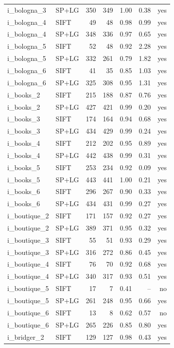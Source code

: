\begin{longtable}{llrrrrr}
i\_bologna\_3 & SP+LG & 350 & 349 & 1.00 & 0.38 & yes \\
i\_bologna\_4 & SIFT & 49 & 48 & 0.98 & 0.99 & yes \\
i\_bologna\_4 & SP+LG & 348 & 336 & 0.97 & 0.65 & yes \\
i\_bologna\_5 & SIFT & 52 & 48 & 0.92 & 2.28 & yes \\
i\_bologna\_5 & SP+LG & 332 & 261 & 0.79 & 1.82 & yes \\
i\_bologna\_6 & SIFT & 41 & 35 & 0.85 & 1.03 & yes \\
i\_bologna\_6 & SP+LG & 325 & 308 & 0.95 & 1.31 & yes \\
i\_books\_2 & SIFT & 215 & 188 & 0.87 & 0.76 & yes \\
i\_books\_2 & SP+LG & 427 & 421 & 0.99 & 0.20 & yes \\
i\_books\_3 & SIFT & 174 & 164 & 0.94 & 0.68 & yes \\
i\_books\_3 & SP+LG & 434 & 429 & 0.99 & 0.24 & yes \\
i\_books\_4 & SIFT & 212 & 202 & 0.95 & 0.89 & yes \\
i\_books\_4 & SP+LG & 442 & 438 & 0.99 & 0.31 & yes \\
i\_books\_5 & SIFT & 253 & 234 & 0.92 & 0.09 & yes \\
i\_books\_5 & SP+LG & 443 & 441 & 1.00 & 0.21 & yes \\
i\_books\_6 & SIFT & 296 & 267 & 0.90 & 0.33 & yes \\
i\_books\_6 & SP+LG & 434 & 431 & 0.99 & 0.27 & yes \\
i\_boutique\_2 & SIFT & 171 & 157 & 0.92 & 0.27 & yes \\
i\_boutique\_2 & SP+LG & 389 & 371 & 0.95 & 0.32 & yes \\
i\_boutique\_3 & SIFT & 55 & 51 & 0.93 & 0.29 & yes \\
i\_boutique\_3 & SP+LG & 316 & 272 & 0.86 & 0.45 & yes \\
i\_boutique\_4 & SIFT & 76 & 70 & 0.92 & 0.68 & yes \\
i\_boutique\_4 & SP+LG & 340 & 317 & 0.93 & 0.51 & yes \\
i\_boutique\_5 & SIFT & 17 & 7 & 0.41 & -- & no \\
i\_boutique\_5 & SP+LG & 261 & 248 & 0.95 & 0.66 & yes \\
i\_boutique\_6 & SIFT & 13 & 8 & 0.62 & 0.57 & no \\
i\_boutique\_6 & SP+LG & 265 & 226 & 0.85 & 0.80 & yes \\
i\_bridger\_2 & SIFT & 129 & 127 & 0.98 & 0.43 & yes \\

\end{longtable}
